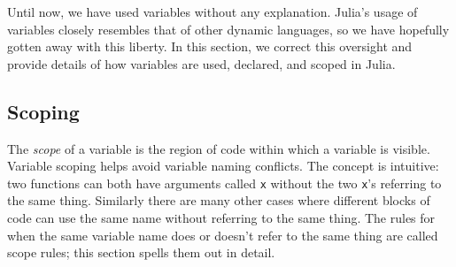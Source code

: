 \documentclass{article}
\renewcommand{\sec}[1]{\label{sec:#1}}
\begin{document}
Until now, we have used variables without any explanation.
Julia's usage of variables closely resembles that of other dynamic languages, so we have hopefully gotten away with this liberty.
In this section, we correct this oversight and provide details of how variables are used, declared, and scoped in Julia.

\subsection{Scoping}\sec{scoping}

The \emph{scope} of a variable is the region of code within which a variable
is visible.
Variable scoping helps avoid variable naming conflicts.
The concept is intuitive:
two functions can both have arguments called \verb|x| without the two \verb|x|'s referring to the same thing.
Similarly there are many other cases where different blocks of code can use the same name without referring to the same thing.
The rules for when the same variable name does or doesn't refer to the same thing are called scope rules;
this section spells them out in detail.
\end{document}
